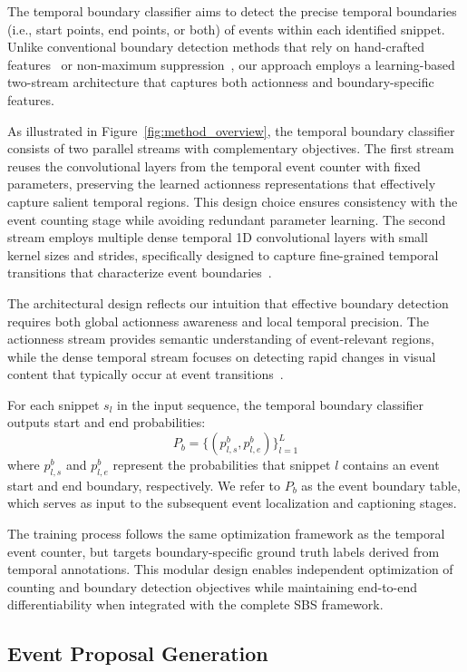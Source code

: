 The temporal boundary classifier aims to detect the precise temporal boundaries (i.e., start points, end points, or both) of events within each identified snippet. Unlike conventional boundary detection methods that rely on hand-crafted features~\cite{lin2018bsn} or non-maximum suppression~\cite{hosang2017learning}, our approach employs a learning-based two-stream architecture that captures both actionness and boundary-specific features.

As illustrated in Figure~\ref{fig:method_overview}, the temporal boundary classifier consists of two parallel streams with complementary objectives. The first stream reuses the convolutional layers from the temporal event counter with fixed parameters, preserving the learned actionness representations that effectively capture salient temporal regions. This design choice ensures consistency with the event counting stage while avoiding redundant parameter learning. The second stream employs multiple dense temporal 1D convolutional layers with small kernel sizes and strides, specifically designed to capture fine-grained temporal transitions that characterize event boundaries~\cite{lin2019bmn,zhao2020bottom}.

The architectural design reflects our intuition that effective boundary detection requires both global actionness awareness and local temporal precision. The actionness stream provides semantic understanding of event-relevant regions, while the dense temporal stream focuses on detecting rapid changes in visual content that typically occur at event transitions~\cite{long2019gaussian,yuan2017temporal}. 

For each snippet $s_l$ in the input sequence, the temporal boundary classifier outputs start and end probabilities:
$$P_b = \{(p_{l,s}^b, p_{l,e}^b)\}_{l=1}^{L}$$
where $p_{l,s}^b$ and $p_{l,e}^b$ represent the probabilities that snippet $l$ contains an event start and end boundary, respectively. We refer to $P_b$ as the event boundary table, which serves as input to the subsequent event localization and captioning stages.

The training process follows the same optimization framework as the temporal event counter, but targets boundary-specific ground truth labels derived from temporal annotations. This modular design enables independent optimization of counting and boundary detection objectives while maintaining end-to-end differentiability when integrated with the complete SBS framework.

\subsection{Event Proposal Generation}%
\label{subsec:method_event_proposal_generation}

